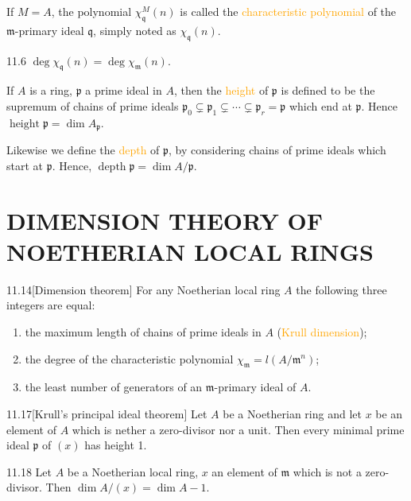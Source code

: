 If $M=A$, the polynomial $\chi_\mathfrak{q}^M(n)$ is called the \textcolor{orange}{characteristic polynomial} of the $\mathfrak{m}$-primary ideal $\mathfrak{q}$, simply noted as $\chi_\mathfrak{q}(n)$.

\begin{proposition}{11.6}
	$\operatorname{deg}\chi_\mathfrak{q}(n)=\operatorname{deg}\chi_\mathfrak{m}(n)$.
\end{proposition}

If $A$ is a ring, $\mathfrak{p}$ a prime ideal in $A$, then the \textcolor{orange}{height} of $\mathfrak{p}$ is defined to be the supremum of chains of prime ideals $\mathfrak{p}_0\subsetneq\mathfrak{p}_1\subsetneq\cdots\subsetneq\mathfrak{p}_r=\mathfrak{p}$ which end at $\mathfrak{p}$. Hence $\operatorname{height}\mathfrak{p}=\dim A_\mathfrak{p}$.

Likewise we define the \textcolor{orange}{depth} of $\mathfrak{p}$, by considering chains of prime ideals which start at $\mathfrak{p}$. Hence, $\operatorname{depth}\mathfrak{p}=\dim A/\mathfrak{p}$.

\section*{DIMENSION THEORY OF NOETHERIAN LOCAL RINGS}

\begin{theorem}{11.14}[Dimension theorem]
	For any Noetherian local ring $A$ the following three integers are equal:
	\begin{enumerate}[label=\textup{(\roman*)}]
		\item the maximum length of chains of prime ideals in $A$ (\textcolor{orange}{Krull dimension});
		\item the degree of the characteristic polynomial $\chi_\mathfrak{m}=l\left(A/\mathfrak{m}^n\right)$;
		\item the least number of generators of an $\mathfrak{m}$-primary ideal of $A$.
	\end{enumerate}
\end{theorem}

\begin{corollary}{11.17}[Krull's principal ideal theorem]
	Let $A$ be a Noetherian ring and let $x$ be an element of $A$ which is nether a zero-divisor nor a unit. Then every minimal prime ideal $\mathfrak{p}$ of $(x)$ has height 1.
\end{corollary}

\begin{corollary}{11.18}
	Let $A$ be a Noetherian local ring, $x$ an element of $\mathfrak{m}$ which is not a zero-divisor. Then $\dim A/(x)=\dim A-1$.
\end{corollary}

